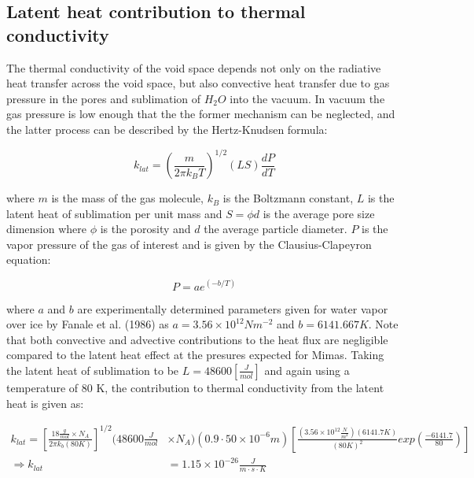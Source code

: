 \documentclass[11pt]{article} %
\begin{document}
\subsection{Latent heat contribution to thermal conductivity}
	The thermal conductivity of the void space depends not only on the radiative heat transfer across the void space, but also convective heat transfer due to gas pressure in the pores and sublimation of $H_{2}O$ into the vacuum. In vacuum the gas pressure is low enough that the the former mechanism can be neglected, and the latter process can be described by the Hertz-Knudsen formula:

	\begin{equation}
	k_{lat} = ( \frac{m}{2 \pi k_{B} T})^{1/2}  (L S) \frac{dP}{dT}
	\end{equation}
	
	where $m$ is the mass of the gas molecule, $k_{B}$ is the Boltzmann constant, $L$ is the latent heat of sublimation per unit mass and $S = \phi d$ is the average pore size dimension where $\phi$ is the porosity and $d$ the average particle diameter. $P$ is the vapor pressure of the gas of interest and is given by the Clausius-Clapeyron equation:
	 
	 \begin{equation}
	 P = ae^{(-b/T)}
	 \end{equation}
	 
	 where $a$ and $b$ are experimentally determined parameters given for water vapor over ice by Fanale et al. (1986) as $a = 3.56 \times 10^{12} N m^{-2}$ and $b = 6141.667 K$. Note that both convective and advective contributions to the heat flux are negligible compared to the latent heat effect at the presures expected for Mimas. Taking the latent heat of sublimation to be $L = 48600 [\frac{J}{mol}]$ and again using a temperature of 80 K, the contribution to thermal conductivity from the latent heat is given as:
	
	\begin{equation}
	\begin{split}
	k_{lat} = [ \frac{18 \frac{g}{mol} \times N_{A}}{2 \pi k_{b} (80K)} ]^{1/2} (48600 \frac{J}{mol} & \times N_{A})(0.9 \cdot 50\times10^{-6} m) [ \frac{(3.56\times 10^{12} \frac{N}{m^{2}})(6141.7 K)}{(80 K)^{2}} exp( \frac{-6141.7}{80} ) ] \\
	\Rightarrow k_{lat} &= 1.15\times10^{-26}\frac{J}{m \cdot s \cdot K}
	\end{split}
	\end{equation}
	
\end{document}
